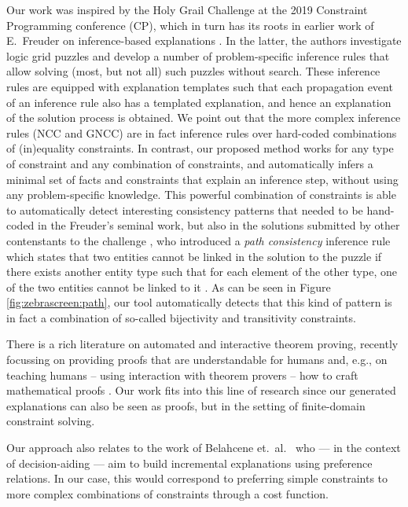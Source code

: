 Our work was inspired by the Holy Grail Challenge \cite{freuder2018progress} at the 2019 Constraint Programming conference (CP), which in turn has its roots in earlier work of E.~Freuder on inference-based explanations \cite{sqalli1996inference}. 
In the latter, the authors investigate logic grid puzzles and develop a number of problem-specific inference rules that allow solving (most, but not all) such puzzles without search. 
These inference rules are equipped with explanation templates such that each propagation event of an inference rule also has a templated explanation, and hence an explanation of the solution process is obtained. 
We point out that the more complex inference rules (NCC and GNCC) are in fact inference rules over hard-coded combinations of (in)equality constraints. 
In contrast, our proposed method works for any type of constraint and any combination of constraints, and automatically infers a minimal set of facts and constraints that explain an inference step, without using any problem-specific knowledge.
This powerful combination of constraints is able to automatically detect interesting consistency patterns that needed to be hand-coded in the Freuder's seminal work, but also in the solutions submitted by other 
contenstants to the challenge \cite{escamocher2019solving}, who introduced a \emph{path consistency} inference rule which states that two entities cannot be linked in the solution to the puzzle if there exists another entity type such that for each element of the other type, one of the two entities cannot be linked to it . 
As can be seen in Figure \ref{fig:zebrascreen:path}, our tool automatically detects that this kind of pattern is in fact a combination of so-called bijectivity and transitivity constraints.  


There is a rich literature on automated and interactive theorem proving, recently focussing on providing proofs that are understandable for humans \cite{Ganesalingam2017} and, e.g.,  on teaching humans -- using interaction with theorem provers -- how to craft mathematical proofs \cite{DBLP:conf/icml/YangD19}. 
Our work fits into this line of research since our generated explanations can also be seen as proofs, but in the setting of finite-domain constraint solving.

Our approach also relates to the work of Belahcene et.\ al.~\cite{belahcene2017explaining} who --- in the context of decision-aiding --- aim to build incremental explanations using preference relations. In our case, this would correspond to preferring simple constraints to more complex combinations of constraints through a cost function.
